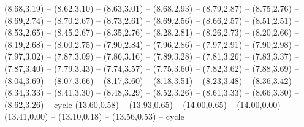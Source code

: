 \expandafter\def\csname geo:gebiet:SRB\endcsname{
  (8.68,3.19) -- (8.62,3.10) -- (8.63,3.01) -- (8.68,2.93) -- (8.79,2.87) -- (8.75,2.76) -- (8.69,2.74) -- (8.70,2.67) -- (8.73,2.61) -- (8.69,2.56) -- (8.66,2.57) -- (8.51,2.51) -- (8.53,2.65) -- (8.45,2.67) -- (8.35,2.76) -- (8.28,2.81) -- (8.26,2.73) -- (8.20,2.66) -- (8.19,2.68) -- (8.00,2.75) -- (7.90,2.84) -- (7.96,2.86) -- (7.97,2.91) -- (7.90,2.98) -- (7.97,3.02) -- (7.87,3.09) -- (7.86,3.16) -- (7.89,3.28) -- (7.81,3.26) -- (7.83,3.37) -- (7.87,3.40) -- (7.79,3.43) -- (7.74,3.57) -- (7.75,3.60) -- (7.82,3.62) -- (7.88,3.69) -- (8.04,3.69) -- (8.07,3.66) -- (8.17,3.60) -- (8.18,3.51) -- (8.23,3.48) -- (8.36,3.42) -- (8.34,3.33) -- (8.41,3.30) -- (8.48,3.29) -- (8.52,3.26) -- (8.61,3.33) -- (8.66,3.30) -- (8.62,3.26) -- cycle}
\expandafter\def\csname geo:gebiet:SAU\endcsname{
  (13.60,0.58) -- (13.93,0.65) -- (14.00,0.65) -- (14.00,0.00) -- (13.41,0.00) -- (13.10,0.18) -- (13.56,0.53) -- cycle}
\expandafter\def\csname geo:gebiet:SMR\endcsname{
  }
